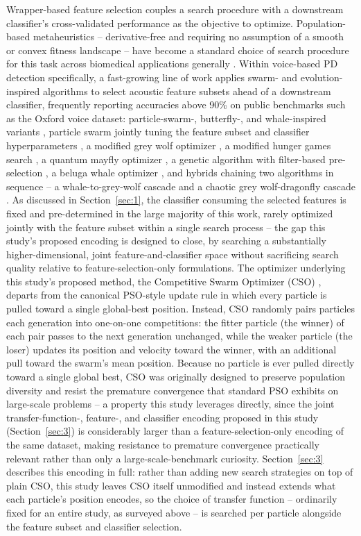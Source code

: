 Wrapper-based feature selection couples a search procedure with a
downstream classifier's cross-validated performance as the objective to
optimize. Population-based metaheuristics -- derivative-free and
requiring no assumption of a smooth or convex fitness landscape -- have
become a standard choice of search procedure for this task across
biomedical applications generally \cite{BarreraGarcia:2023}. Within
voice-based PD detection specifically, a fast-growing line of work applies
swarm- and evolution-inspired algorithms to select acoustic feature
subsets ahead of a downstream classifier, frequently reporting accuracies
above 90\% on public benchmarks such as the Oxford voice dataset:
particle-swarm-, butterfly-, and whale-inspired variants
\cite{Hashemi:2026}, particle swarm jointly tuning the feature subset and
classifier hyperparameters \cite{Eliwa:2025}, a modified grey wolf
optimizer \cite{Santhosh:2025}, a modified hunger games search
\cite{Hashim:2023}, a quantum mayfly optimizer \cite{Mansour:2024}, a
genetic algorithm with filter-based pre-selection \cite{Ali:2023}, a
beluga whale optimizer \cite{Ganesan:2025}, and hybrids chaining two
algorithms in sequence -- a whale-to-grey-wolf cascade
\cite{AlNajjar:2024} and a chaotic grey wolf-dragonfly cascade
\cite{Appati:2026}. As discussed in Section~\ref{sec:1}, the
classifier consuming the selected features is fixed and pre-determined in
the large majority of this work, rarely optimized jointly with the
feature subset within a single search process -- the gap this study's
proposed encoding is designed to close, by searching a substantially
higher-dimensional, joint feature-and-classifier space without
sacrificing search quality relative to feature-selection-only
formulations. The optimizer underlying this study's proposed method, the
Competitive Swarm Optimizer (CSO) \cite{Cheng:2015}, departs from the
canonical PSO-style update rule in which every particle is pulled toward a
single global-best position. Instead, CSO randomly pairs particles each
generation into one-on-one competitions: the fitter particle (the winner)
of each pair passes to the next generation unchanged, while the weaker
particle (the loser) updates its position and velocity toward the winner,
with an additional pull toward the swarm's mean position. Because no
particle is ever pulled directly toward a single global best, CSO was
originally designed to preserve population diversity and resist the
premature convergence that standard PSO exhibits on large-scale problems
-- a property this study leverages directly, since the joint
transfer-function-, feature-, and classifier encoding proposed in this
study (Section~\ref{sec:3}) is considerably larger than a
feature-selection-only encoding of the same dataset, making resistance to
premature convergence practically relevant rather than only a
large-scale-benchmark curiosity. Section~\ref{sec:3} describes this
encoding in full: rather than adding new search strategies on top of
plain CSO, this study leaves CSO itself unmodified and instead extends
what each particle's position encodes, so the choice of transfer
function -- ordinarily fixed for an entire study, as surveyed above -- is
searched per particle alongside the feature subset and classifier
selection.
